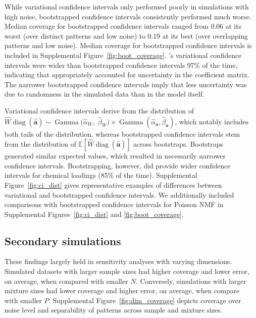 While variational confidence intervals only performed poorly in simulations with high noise, bootstrapped confidence intervals consistently performed much worse. Median coverage for bootstrapped \bnmf confidence intervals ranged from 0.06 at its worst (over distinct patterns and low noise) to 0.19 at its best (over overlapping patterns and low noise). Median coverage for bootstrapped confidence intervals is included in Supplemental Figure~\ref{fig:boot_coverage}. \bnmfc's variational confidence intervals were wider than bootstrapped confidence intervals 97\% of the time, indicating that \bnmf appropriately accounted for uncertainty in the coefficient matrix. The narrower bootstrapped confidence intervals imply that less uncertainty was due to randomness in the simulated data than in the model itself.

Variational confidence intervals derive from the distribution of $\hat{W}\operatorname{diag}(\hat{\mathbf{a}}) \sim \operatorname{Gamma}(\hat{\alpha}_W,$ $\hat{\beta}_W) \times \operatorname{Gamma}(\hat{\alpha}_\mathbf{a}, \hat{\beta}_\mathbf{a})$, which notably includes both tails of the distribution, whereas bootstrapped confidence intervals stem from the distribution of $\mathbb{E}\left[\hat{W}\operatorname{diag}(\hat{\mathbf{a}})\right]$ across bootstraps. Bootstraps generated similar expected values, which resulted in necessarily narrower confidence intervals. Bootstrapping, however, did provide wider confidence intervals for chemical loadings (85\% of the time). Supplemental Figure~\ref{fig:ci_dist} gives representative examples of differences between variational and bootstrapped confidence intervals. We additionally included comparisons with bootstrapped confidence intervals for Poisson NMF in Supplemental Figures~\ref{fig:ci_dist} and \ref{fig:boot_coverage}.

\subsection{Secondary simulations}
These findings largely held in sensitivity analyses with varying dimensions. Simulated datasets with larger sample sizes had higher coverage and lower error, on average, when compared with smaller $N$. Conversely, simulations with larger mixture sizes had lower coverage and higher error, on average, when compare with smaller $P$. Supplemental Figure~\ref{fig:dim_coverage} depicts \bnmf coverage over noise level and separability of patterns across sample and mixture sizes.


